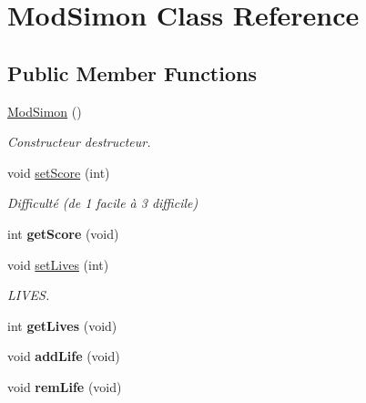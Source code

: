\hypertarget{class_mod_simon}{}\section{Mod\+Simon Class Reference}
\label{class_mod_simon}
\subsection*{Public Member Functions}
\begin{DoxyCompactItemize}
\item 
\mbox{\label{class_mod_simon_ab0d0f1892c49547a48d8ebf60320e112}} 
\hyperlink{class_mod_simon_ab0d0f1892c49547a48d8ebf60320e112}{Mod\+Simon} ()
\begin{DoxyCompactList}\small\item\em Constructeur destructeur. \end{DoxyCompactList}\item 
void \hyperlink{class_mod_simon_a5f019f6797813a9d2bd11c1e1692e1dd}{set\+Score} (int)
\begin{DoxyCompactList}\small\item\em Difficulté (de 1 facile à 3 difficile) \end{DoxyCompactList}\item 
\mbox{\label{class_mod_simon_acde5770e1ab2106d8aa0a761a71bf3e7}} 
int {\bfseries get\+Score} (void)
\item 
void \hyperlink{class_mod_simon_a8aa773733ce3e7cca012cf60383210aa}{set\+Lives} (int)
\begin{DoxyCompactList}\small\item\em L\+I\+V\+ES. \end{DoxyCompactList}\item 
\mbox{\label{class_mod_simon_a45e3ade3fa62dedf4e3e2400694f7a96}} 
int {\bfseries get\+Lives} (void)
\item 
\mbox{\label{class_mod_simon_a35b0b5c515c57e5a85d61f0dba653dcc}} 
void {\bfseries add\+Life} (void)
\item 
\mbox{\label{class_mod_simon_ae11ecd95722ad8591d3c4d67f23d50ee}} 
void {\bfseries rem\+Life} (void)
\item 
\mbox{\label{class_mod_simon_a3b031c28072d6564e238daacc254c522}} 

\end{DoxyCompactItemize}
